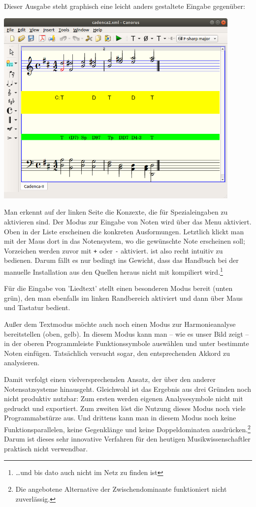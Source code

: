 Dieser Ausgabe steht graphisch eine leicht anders gestaltete Eingabe gegenüber:
\begin{center}
\includegraphics[width=0.9\textwidth]{frontends/canorus/cadenca2-canorus.png}
\end{center}

Man erkennt auf der linken Seite die Konzexte, die für Spezialeingaben zu
aktivieren sind. Der Modus zur Eingabe von Noten wird über das Menu aktiviert.
Oben in der Liste erscheinen die konkreten Ausformungen. Letztlich klickt man
mit der Maus dort in das Notensystem, wo die gewünschte Note erscheinen soll;
Vorzeichen werden zuvor mit \texttt{+} oder \texttt{-} aktiviert. 
ist also recht intuitiv zu bedienen. Darum fällt es nur bedingt ins Gewicht, dass
das Handbuch bei der manuelle Installation aus den Quellen heraus nicht mit
kompiliert wird.\footnote{\ldots und bis dato auch nicht im Netz zu finden ist}

Für die Eingabe von 'Liedtext' stellt  einen besonderen Modus
bereit (unten grün), den man ebenfalls im linken Randbereich aktiviert und dann
über Maus und Tastatur bedient.

Außer dem Textmodus möchte  auch noch einen Modus zur
Harmonieanalyse bereitstellen (oben, gelb). In diesem Modus kann man -- wie es
unser Bild zeigt -- in der oberen Programmleiste Funktionssymbole auswählen und
unter bestimmte Noten einfügen. Tatsächlich versucht  sogar, den
entsprechenden Akkord zu analysieren.

Damit verfolgt  einen vielversprechenden Ansatz, der über den
anderer Notensatzsysteme hinausgeht. Gleichwohl ist das Ergebnis aus drei
Gründen noch nicht produktiv nutzbar: Zum ersten werden  eigenen
Analysesymbole nicht mit gedruckt und exportiert. Zum zweiten löst die Nutzung
dieses Modus noch viele Pro\-gramm\-ab\-stürze aus. Und drittens kann man in diesem
Modus noch keine Funktionsparallelen, keine Gegenklänge und keine
Doppeldominaten ausdrücken.\footnote{Die angebotene Alternative der
Zwischendominante funktioniert nicht zuverlässig.} Darum ist dieses sehr
innovative Verfahren für den heutigen Musikwissenschaftler praktisch nicht
verwendbar.

